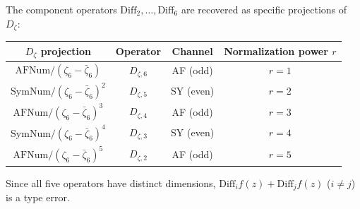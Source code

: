 The component operators $\mathrm{Diff}_2, \ldots, \mathrm{Diff}_6$ are recovered as specific projections of $D_\zeta$:

\begin{center}
\begin{tabular}{|c|c|c|c|}
\hline
$D_\zeta$ projection & Operator & Channel & Normalization power $r$ \\
\hline
$\mathrm{AFNum} / (\zeta_6 - \bar{\zeta}_6)$ & $D_{\zeta,6}$ & AF (odd) & $r = 1$ \\
$\mathrm{SymNum} / (\zeta_6 - \bar{\zeta}_6)^2$ & $D_{\zeta,5}$ & SY (even) & $r = 2$ \\
$\mathrm{AFNum} / (\zeta_6 - \bar{\zeta}_6)^3$ & $D_{\zeta,4}$ & AF (odd) & $r = 3$ \\
$\mathrm{SymNum} / (\zeta_6 - \bar{\zeta}_6)^4$ & $D_{\zeta,3}$ & SY (even) & $r = 4$ \\
$\mathrm{AFNum} / (\zeta_6 - \bar{\zeta}_6)^5$ & $D_{\zeta,2}$ & AF (odd) & $r = 5$ \\
\hline
\end{tabular}
\end{center}

Since all five operators have distinct dimensions, $\mathrm{Diff}_i f(z) + \mathrm{Diff}_j f(z)$ ($i \neq j$) is a type error.
